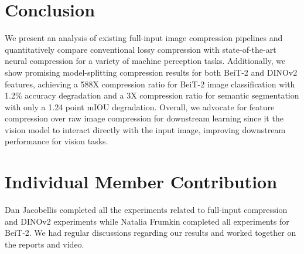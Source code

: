\documentclass[10pt,twocolumn,letterpaper]{article}
\begin{document}


\section{Conclusion}
We present an analysis of existing full-input image compression pipelines and quantitatively compare conventional lossy compression with state-of-the-art neural compression for a variety of machine perception tasks. Additionally, we show promising model-splitting compression results for both BeiT-2 and DINOv2 features, achieving a 588X compression ratio for BeiT-2 image classification with 1.2\% accuracy degradation and a 3X compression ratio for semantic segmentation with only a 1.24 point mIOU degradation. Overall, we advocate for feature compression over raw image compression for downstream learning since it the vision model to interact directly with the input image, improving downstream performance for vision tasks.

\section{Individual Member Contribution}
Dan Jacobellis completed all the experiments related to full-input compression and DINOv2 experiments while Natalia Frumkin completed all experiments for BeiT-2. We had regular discussions regarding our results and worked together on the reports and video.


{\small


}
\end{document}
